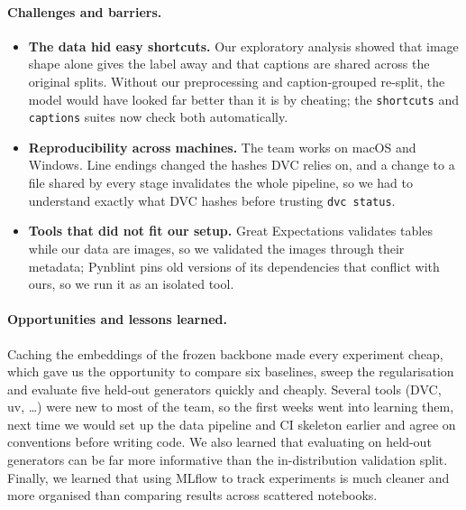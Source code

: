 \documentclass[11pt]{article}
\begin{document}
\paragraph{Challenges and barriers.}
\begin{itemize}[nosep,leftmargin=1.4em]

\medskip

  \item \textbf{The data hid easy shortcuts.} Our exploratory analysis showed that image shape alone gives the label away and that captions are shared across the original splits. Without our preprocessing and caption-grouped re-split, the model would have looked far better than it is by cheating; the \texttt{shortcuts} and \texttt{captions} suites now check both automatically.

\medskip

  \item \textbf{Reproducibility across machines.} The team works on macOS and Windows. Line endings changed the hashes DVC relies on, and a change to a file shared by every stage invalidates the whole pipeline, so we had to understand exactly what DVC hashes before trusting \texttt{dvc status}.

\medskip

  \item \textbf{Tools that did not fit our setup.} Great Expectations validates tables while our data are images, so we validated the images through their metadata; Pynblint pins old versions of its dependencies that conflict with ours, so we run it as an isolated tool.
\end{itemize}

\paragraph{Opportunities and lessons learned.} Caching the embeddings of the frozen backbone made every experiment cheap, which gave us the opportunity to compare six baselines, sweep the regularisation and evaluate five held-out generators quickly and cheaply. Several tools (DVC, uv, \dots) were new to most of the team, so the first weeks went into learning them, next time we would set up the data pipeline and CI skeleton earlier and agree on conventions before writing code. We also learned that evaluating on held-out generators can be far more informative than the in-distribution validation split. Finally, we learned that using MLflow to track experiments is much cleaner and more organised than comparing results across scattered notebooks.
\end{document}
